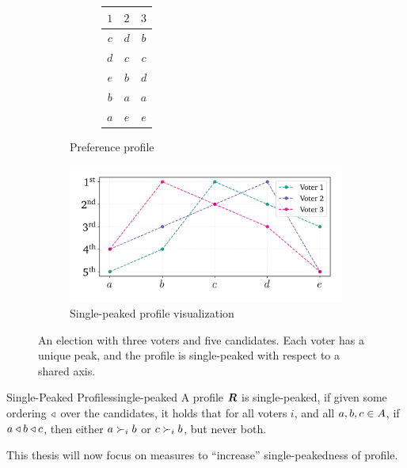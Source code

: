 \begin{figure}[ht]
	\centering
	\begin{subfigure}[b]{0.3\textwidth}
		\centering
		\begin{subfigure}[b]{0.3\textwidth}
			\centering
			\begin{tabular}{ccc}
				\toprule
				$1$ & $2$ & $3$ \\
				\midrule
				$c$ & $d$ & $b$ \\
				$d$ & $c$ & $c$ \\
				$e$ & $b$ & $d$ \\
				$b$ & $a$ & $a$ \\
				$a$ & $e$ & $e$ \\
				\bottomrule
			\end{tabular}
			\vspace{2.8em}
		\end{subfigure}
		\caption{Preference profile}\label{tab:corresponding_profile}
	\end{subfigure}
	\hfill
	\begin{subfigure}[b]{0.65\textwidth}
		\centering
		\includegraphics[width=\textwidth]{Figures/single_peak_vis.png}
		\caption{Single-peaked profile visualization}\label{fig:singlepeaked_vis}
	\end{subfigure}
	\caption{An election with three voters and five candidates. Each voter has a unique peak, and the profile is single-peaked with respect to a shared axis.}
	\label{fig:singlepeaked_full}
\end{figure}
\begin{definition}{Single-Peaked Profiles}{single-peaked}
	A profile $\boldsymbol{R}$ is single-peaked, if given some ordering
	$\triangleleft$ over the candidates, it holds that for all voters $i$, and
	all $a, b, c \in A$, if $a \triangleleft b \triangleleft c$, then
	either $a \succ_i b$ or $c \succ_i b$, but never both.
\end{definition}

This thesis will now focus on measures to ``increase'' single-peakedness of profile.




